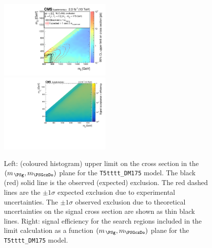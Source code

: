 \clearpage
\begin{figure}[!h]
  \begin{center}
    \includegraphics[width=0.49\textwidth]{Supplementary/RA1T5ttttDM175XSEC_aux} \, 
    \includegraphics[width=0.49\textwidth]{Supplementary/T5ttttDM175_merging_4_cats_aux} \,     
  \end{center}
  \caption{Left: (coloured histogram) upper limit on the cross section in the $(m_{\,\PSg}, m_{\PSGczDo})$ plane for the \texttt{T5tttt\_DM175} model. 
  The black (red) solid line is the observed (expected) exclusion. The red dashed lines are the $\pm1\sigma$ expected exclusion due to experimental uncertainties. 
  The $\pm1\sigma$ observed exclusion due to theoretical uncertainties on the signal cross section are shown as thin black lines. 
  Right: signal efficiency for the search regions included in the limit calculation as a function $(m_{\,\PSg}, m_{\PSGczDo})$ plane for the \texttt{T5tttt\_DM175} model. 
  \label{fig:T5ttttDM175_excl}}
\end{figure}

